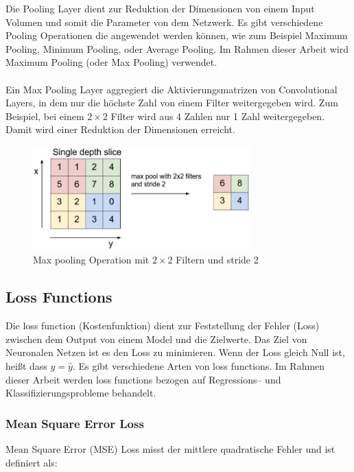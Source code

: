 Die Pooling Layer dient zur Reduktion der Dimensionen von einem Input Volumen und somit die Parameter von dem Netzwerk. Es gibt 
verschiedene Pooling Operationen die angewendet werden können, wie zum Beispiel Maximum Pooling, Minimum Pooling, oder Average Pooling. Im Rahmen 
dieser Arbeit wird Maximum Pooling (oder Max Pooling) verwendet.
\\
\\
Ein Max Pooling \gls{Layer} aggregiert die Aktivierungsmatrizen von Convolutional Layers, in dem nur die höchste Zahl von einem Filter weitergegeben 
wird. Zum Beispiel, bei einem $ 2 \times 2 $ Filter wird aus 4 Zahlen nur 1 Zahl weitergegeben. Damit wird einer Reduktion der Dimensionen erreicht.

\begin{figure}[H]
  \centering
  \includegraphics[width=0.75\textwidth]{resources/cnn/pooling.png}
  \caption{
    Max pooling Operation mit $ 2 \times 2 $ Filtern und \gls{stride} 2
    \cite{convnet-demo}
  }
  \label{image:pooling}
\end{figure}

\subsection{Loss Functions}
Die \gls{loss function} (Kostenfunktion) dient zur Feststellung der Fehler (Loss) zwischen dem Output von einem Model und die Zielwerte. 
Das Ziel von Neuronalen Netzen ist es den Loss zu minimieren. Wenn der Loss gleich Null ist, heißt dass $ y = \hat{y} $. Es gibt verschiedene Arten 
von \gls{loss function}s. Im Rahmen dieser Arbeit werden \gls{loss function}s bezogen auf Regressions– und Klassifizierungsprobleme behandelt.

\subsubsection{Mean Square Error Loss}
Mean Square Error (MSE) Loss misst der mittlere quadratische Fehler und ist definiert als:

